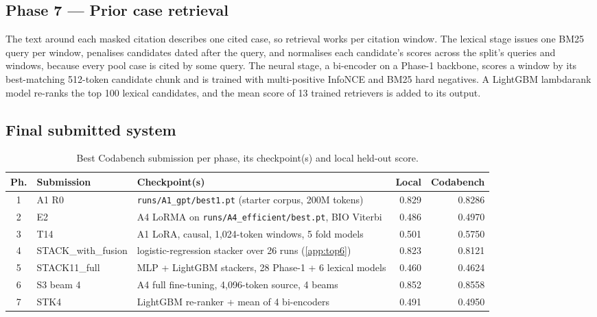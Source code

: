 \documentclass[11pt, oneside]{article}
\newcommand{\code}[1]{\texttt{\small #1}}
\begin{document}
\subsection{Phase 7 --- Prior case retrieval}
The text around each masked citation describes one cited case, so retrieval works per citation window.  The
lexical stage issues one BM25 \cite{robertson2009bm25} query per window, penalises candidates dated after the
query, and normalises each candidate's scores across the split's queries and windows, because every pool case
is cited by some query.  The neural stage, a bi-encoder on a Phase-1 backbone, scores a window by its best-matching
512-token candidate chunk and is trained with multi-positive InfoNCE \cite{oord2018cpc} and BM25 hard negatives.  A LightGBM lambdarank model re-ranks the top 100
lexical candidates, and the mean score of 13 trained retrievers is added to its output.

\subsection{Final submitted system}
\begin{table}[!t]\centering\footnotesize
\caption{Best Codabench submission per phase, its checkpoint(s) and local held-out score.}\label{tab:final}
\begin{tabularx}{\linewidth}{clXrr}\toprule
Ph. & Submission & Checkpoint(s) & Local & Codabench\\\midrule
1 & A1 R0 & \code{runs/A1\_gpt/best1.pt} (starter corpus, 200M tokens) & 0.829 & 0.8286\\
2 & E2 & A4 LoRMA on \code{runs/A4\_efficient/best.pt}, BIO Viterbi & 0.486 & 0.4970\\
3 & T14 & A1 LoRA, causal, 1,024-token windows, 5 fold models & 0.501 & 0.5750\\
4 & STACK\_with\_fusion & logistic-regression stacker over 26 runs (\autoref{app:top6}) & 0.823 & 0.8121\\
5 & STACK11\_full & MLP + LightGBM stackers, 28 Phase-1 + 6 lexical models & 0.460 & 0.4624\\
6 & S3 beam 4 & A4 full fine-tuning, 4,096-token source, 4 beams & 0.852 & 0.8558\\
7 & STK4 & LightGBM re-ranker + mean of 4 bi-encoders & 0.491 & 0.4950\\
\bottomrule\end{tabularx}\end{table}

\end{document}
